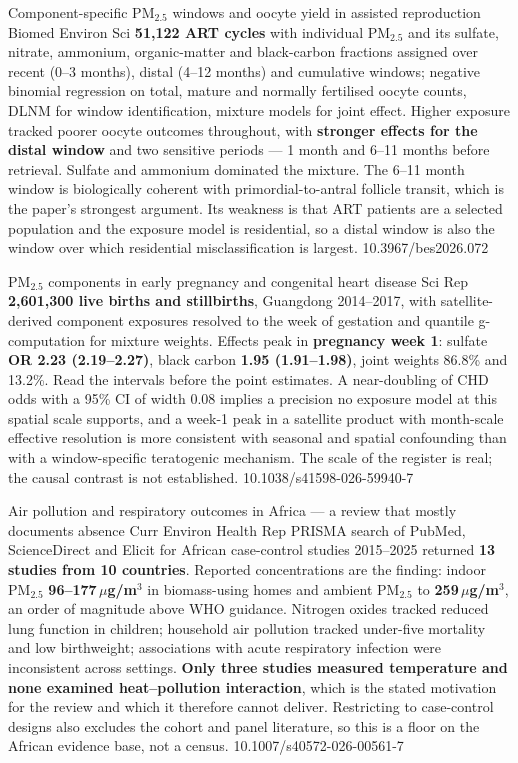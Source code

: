 \documentclass[10pt]{article}
\begin{document}
{Component-specific PM$_{2.5}$ windows and oocyte yield in assisted reproduction}
{Biomed Environ Sci}
{\textbf{51{,}122 ART cycles} with individual PM$_{2.5}$ and its sulfate, nitrate,
ammonium, organic-matter and black-carbon fractions assigned over recent (0--3 months),
distal (4--12 months) and cumulative windows; negative binomial regression on total,
mature and normally fertilised oocyte counts, DLNM for window identification, mixture
models for joint effect. Higher exposure tracked poorer oocyte outcomes throughout, with
\textbf{stronger effects for the distal window} and two sensitive periods --- 1 month and
6--11 months before retrieval. Sulfate and ammonium dominated the mixture. The 6--11 month
window is biologically coherent with primordial-to-antral follicle transit, which is the
paper's strongest argument. Its weakness is that ART patients are a selected population and
the exposure model is residential, so a distal window is also the window over which
residential misclassification is largest.}
{10.3967/bes2026.072}

{PM$_{2.5}$ components in early pregnancy and congenital heart disease}
{Sci Rep}
{\textbf{2{,}601{,}300 live births and stillbirths}, Guangdong 2014--2017, with
satellite-derived component exposures resolved to the week of gestation and quantile
g-computation for mixture weights. Effects peak in \textbf{pregnancy week 1}: sulfate
\textbf{OR 2.23 (2.19--2.27)}, black carbon \textbf{1.95 (1.91--1.98)}, joint weights
86.8\% and 13.2\%. Read the intervals before the point estimates. A near-doubling of CHD
odds with a 95\% CI of width 0.08 implies a precision no exposure model at this spatial
scale supports, and a week-1 peak in a satellite product with month-scale effective
resolution is more consistent with seasonal and spatial confounding than with a
window-specific teratogenic mechanism. The scale of the register is real; the causal
contrast is not established.}
{10.1038/s41598-026-59940-7}


{Air pollution and respiratory outcomes in Africa --- a review that mostly documents absence}
{Curr Environ Health Rep}
{PRISMA search of PubMed, ScienceDirect and Elicit for African case-control studies
2015--2025 returned \textbf{13 studies from 10 countries}. Reported concentrations are the
finding: indoor PM$_{2.5}$ \textbf{96--177\,$\mu$g/m$^3$} in biomass-using homes and
ambient PM$_{2.5}$ to \textbf{259\,$\mu$g/m$^3$}, an order of magnitude above WHO guidance.
Nitrogen oxides tracked reduced lung function in children; household air pollution tracked
under-five mortality and low birthweight; associations with acute respiratory infection
were inconsistent across settings. \textbf{Only three studies measured temperature and none
examined heat--pollution interaction}, which is the stated motivation for the review and
which it therefore cannot deliver. Restricting to case-control designs also excludes the
cohort and panel literature, so this is a floor on the African evidence base, not a census.}
{10.1007/s40572-026-00561-7}
\end{document}
